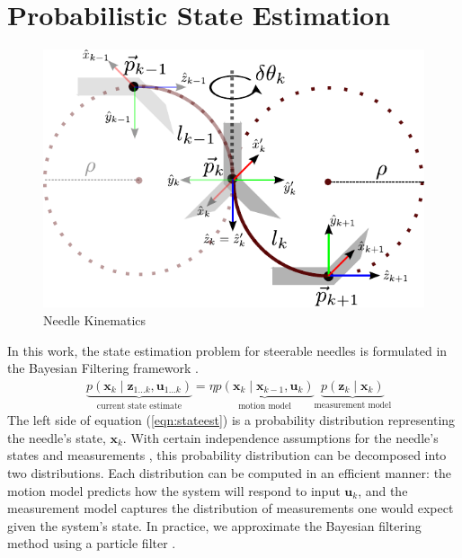 \documentclass[journal,transmag]{IEEEtran}
\newcommand{\bvar}[2]{\mathbf{#1}_{#2}}
\newcommand{\stateest}[1][k]{p(\mathbf{x}_{#1} \mid \mathbf{z}_{1...#1},\mathbf{u}_{1...#1})}
\newcommand{\meas}[1][k]{p(\mathbf{z}_{#1} \mid \mathbf{x}_{#1})}
\newcommand{\motion}[1][k]{p(\mathbf{x}_{#1} \mid \mathbf{x}_{#1-1},\mathbf{u}_{#1})}
\begin{document}
\section{Probabilistic State Estimation}
\begin{figure}[!t]
\centering
\includegraphics[scale=0.9]{Figures/NeedleKinematics.pdf}
\caption{Needle Kinematics}
\label{fig_nk}
\end{figure}

In this work, the state estimation problem for steerable needles is formulated in the Bayesian Filtering framework \cite{Thrun:2005}.
\begin{align}  \label{eqn:stateest}
&\underbrace{\stateest}_{\text{current state estimate}} = \eta \underbrace{\motion}_{\text{motion model}} \underbrace{\meas}_{\text{measurement model}}
\end{align}
The left side of equation (\ref{eqn:stateest}) is a probability distribution representing the needle's state, $\bvar{x}{k}$.  With certain independence assumptions for the needle's states and measurements \cite{Thrun:2005}, this probability distribution can be decomposed into two distributions. Each distribution can be computed in an efficient manner:  the motion model predicts how the system will respond to input $\bvar{u}{k}$, and the measurement model captures the distribution of measurements one would expect given the system's state.   In practice, we approximate the Bayesian filtering method using a particle filter \cite{Gordon1993}.
\end{document}
